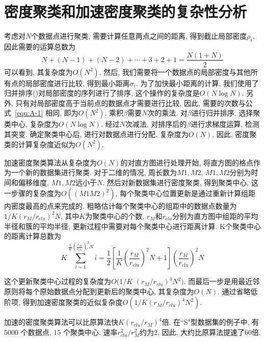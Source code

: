 \section{密度聚类和加速密度聚类的复杂性分析\label{Appendix:A}}
考虑对$N$个数据点进行聚类, 需要计算任意两点之间的距离, 得到截止局部密度$\rho_i$. 因此需要的运算总数为
\begin{equation}
    N+(N-1)+(N-2)+\cdots+3+2+1=\frac{N(1+N)}{2}
    \label{equ:A-1}
\end{equation}
可以看到, 其复杂度为$O(N^2)$. 然后, 我们需要将一个数据点的局部密度与其他所有点的局部密度进行比较, 得到最小距离$\sigma_i$. 为了加快最小距离的计算, 我们使用了归并排序(\cite{Satish2010})对局部密度的序列进行了排序, 这个操作的复杂度是$O(N\log N)$. 另外, 只有对局部密度高于当前点的数据点才需要进行比较, 因此, 需要的次数与公式~\ref{equ:A-1} 相同, 即为$O(N^2)$. 乘积$\beta$需要$N$次的乘法. 对$\beta$进行归并排序, 选择聚类中心, 复杂度为$O(N\log N)$. 经过$N$次减法, 对排序后的$\beta$进行求梯度运算, 检测其突变. 确定聚类中心后, 进行对数据点进行分配, 复杂度为$O(N)$, 因此, 密度聚类的计算复杂度近似为$O(N^2)$. 

加速密度聚类算法从复杂度为$O(N)$的对直方图进行处理开始, 将直方图的格点作为一个新的数据集进行聚类. 对于二维的情况, 周长数为$M1,M2$, $M1,M2$分别为时间和偏移维度, $M1, M2$远小于$N$. 然后对新数据集进行密度聚类, 得到聚类中心, 这一步骤的复杂度为$O((M1M2)^2)$, 每个聚类中心位置更新是通过重新计算组距内密度最高的点来完成的. 粗略估计每个聚类中心的组距中的数据点数量为$1/K(r_M/r_{clu})^2N$, 其中$K$为聚类中心的个数, $r_M$和$r_{clu}$分别为直方图中组距的平均半径和簇的平均半径, 更新过程中需要对每个聚类中心进行距离计算. K个聚类中心的距离计算总数为
\begin{equation}
    K \sum_{i=1}^{\frac{1}{K}(\frac{r_M}{r_{clu}})^2N} i=\frac{1}{2}\left[\frac{1}{K}\left(\frac{r_{M}}{r_{\mathrm{clu}}}\right)^{2} N+1\right]\left(\frac{r_{M}}{r_{\mathrm{clu}}}\right)^{2} N
\end{equation}

这个更新聚类中心过程的复杂度为$O(1/K$ $(r_M/r_{clu})^4N^2)$. 而最后一步是用最近邻原则将每个原始数据点分配到更新后的聚类中心, 其复杂度为$O(N)$. 通过省略低阶项, 得到加速密度聚类的近似复杂度$O(1/K(r_M/r_{clu})^4N^2)$. 

加速的密度聚类算法可以比原算法快$K(r_{clu}/r_M)^4$倍. 在``S"型数据集的例子中, 有 $5000$ 个数据点, $15$ 个聚类中心. 速率$r_{clu}^2/r_M^2$约为$2$, 因此, 大约比原算法提速了$60$倍. 
